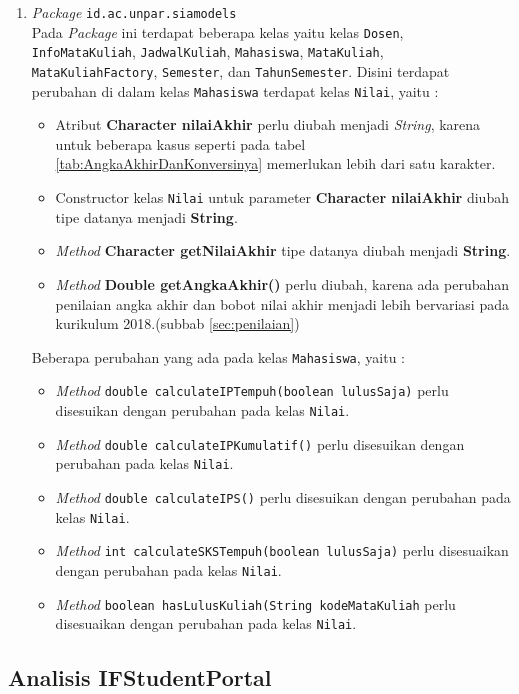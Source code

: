 \begin{enumerate}
	\item \textit{Package} \texttt{id.ac.unpar.siamodels}\\
	Pada \textit{Package} ini terdapat beberapa kelas yaitu kelas \texttt{Dosen}, \texttt{InfoMataKuliah}, \texttt{JadwalKuliah}, \texttt{Mahasiswa}, \texttt{MataKuliah}, \texttt{MataKuliahFactory}, \texttt{Semester}, dan \texttt{TahunSemester}. Disini terdapat perubahan di dalam kelas \texttt{Mahasiswa} terdapat kelas \texttt{Nilai}, yaitu :
	\begin{itemize}
		\item Atribut \textbf{Character nilaiAkhir} perlu diubah menjadi \textit{String}, karena untuk beberapa kasus seperti pada tabel \ref{tab:AngkaAkhirDanKonversinya} memerlukan lebih dari satu karakter.
		\item Constructor kelas \texttt{Nilai} untuk parameter \textbf{Character nilaiAkhir} diubah tipe datanya menjadi \textbf{String}.
		\item \textit{Method} \textbf{Character getNilaiAkhir} tipe datanya diubah menjadi \textbf{String}.
		\item \textit{Method} \textbf{Double getAngkaAkhir()} perlu diubah, karena ada perubahan penilaian angka akhir dan bobot nilai akhir menjadi lebih bervariasi pada kurikulum 2018.(subbab \ref{sec:penilaian}) 
	\end{itemize}
	Beberapa perubahan yang ada pada kelas \texttt{Mahasiswa}, yaitu :
	\begin{itemize}
		\item \textit{Method} \texttt{double calculateIPTempuh(boolean lulusSaja)} perlu disesuikan dengan perubahan pada kelas \texttt{Nilai}.
		\item \textit{Method} \texttt{double calculateIPKumulatif()} perlu disesuikan dengan perubahan pada kelas \texttt{Nilai}.
		\item \textit{Method} \texttt{double calculateIPS()} perlu disesuikan dengan perubahan pada kelas \texttt{Nilai}.
		\item \textit{Method} \texttt{int calculateSKSTempuh(boolean lulusSaja)} perlu disesuaikan dengan perubahan pada kelas \texttt{Nilai}.
		\item \textit{Method} \texttt{boolean hasLulusKuliah(String kodeMataKuliah} perlu disesuaikan dengan perubahan pada kelas \texttt{Nilai}.
	\end{itemize}
\end{enumerate}

\subsection{Analisis IFStudentPortal}

